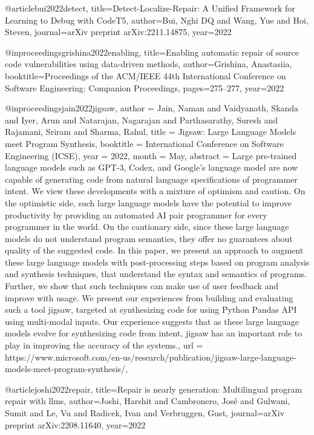 @article{bui2022detect,
  title={Detect-Localize-Repair: A Unified Framework for Learning to Debug with CodeT5},
  author={Bui, Nghi DQ and Wang, Yue and Hoi, Steven},
  journal={arXiv preprint arXiv:2211.14875},
  year={2022}
}

@inproceedings{grishina2022enabling,
  title={Enabling automatic repair of source code vulnerabilities using data-driven methods},
  author={Grishina, Anastasiia},
  booktitle={Proceedings of the ACM/IEEE 44th International Conference on Software Engineering: Companion Proceedings},
  pages={275--277},
  year={2022}
}

@inproceedings{jain2022jigsaw,
author = {Jain, Naman and Vaidyanath, Skanda and Iyer, Arun and Natarajan, Nagarajan and Parthasarathy, Suresh and Rajamani, Sriram and Sharma, Rahul},
title = {Jigsaw: Large Language Models meet Program Synthesis},
booktitle = {International Conference on Software Engineering (ICSE)},
year = {2022},
month = {May},
abstract = {Large pre-trained language models such as GPT-3, Codex, and Google's language model are now capable of generating code from natural language specifications of programmer intent. We view these developments with a mixture of optimism and caution. On the optimistic side, such large language models have the potential to improve productivity by providing an automated AI pair programmer for every programmer in the world. On the cautionary side, since these large language models do not understand program semantics, they offer no guarantees about quality of the suggested code. In this paper, we present an approach to augment these large language models with post-processing steps based on program analysis and synthesis techniques, that understand the syntax and semantics of programs. Further, we show that such techniques can make use of user feedback and improve with usage. We present our experiences from building and evaluating such a tool jigsaw, targeted at synthesizing code for using Python Pandas API using multi-modal inputs. Our experience suggests that as these large language models evolve for synthesizing code from intent, jigsaw has an important role to play in improving the accuracy of the systems.},
url = {https://www.microsoft.com/en-us/research/publication/jigsaw-large-language-models-meet-program-synthesis/},
}

@article{joshi2022repair,
  title={Repair is nearly generation: Multilingual program repair with llms},
  author={Joshi, Harshit and Cambronero, Jos{\'e} and Gulwani, Sumit and Le, Vu and Radicek, Ivan and Verbruggen, Gust},
  journal={arXiv preprint arXiv:2208.11640},
  year={2022}
}

